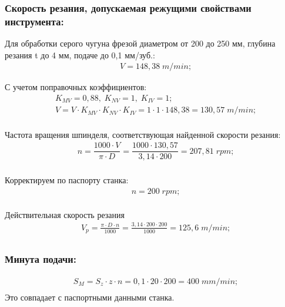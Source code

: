\subsubsection{Скорость резания, допускаемая режущими свойствами инструмента:}
Для обработки серого чугуна фрезой диаметром от 200 до 250 мм, глубина резания t до 4 мм, подаче до 0,1 мм/зуб.:
\begin{equation}
	\begin{split}
		&V=148,38\;m/min;
	\end{split}
\end{equation}

С учетом поправочных коэффициентов:
\begin{equation}
	\begin{split}
		&K_{MV}=0,88,\; K_{NV}=1,\; K_{IV}=1;\\
		&V=V\cdot K_{MV}\cdot K_{NV}\cdot K_{IV}=1\cdot 1\cdot 148,38 = 130,57\; m/min;\\
	\end{split}
\end{equation}

Частота вращения шпинделя, соответствующая найденной скорости резания:
\begin{equation}
	\begin{split}
		&n=\dfrac{1000\cdot V}{\pi \cdot D}=\dfrac{1000\cdot 130,57}{3,14\cdot 200}=207,81\; rpm;\\
	\end{split}
\end{equation}

Корректируем по паспорту станка:
\begin{equation}
	\begin{split}
		&n=200\; rpm;\\
	\end{split}
\end{equation}

Действительная скорость резания
\begin{equation}
	\begin{split}
		&V_p=\frac{\pi \cdot D\cdot n}{1000}=\frac{3,14 \cdot 200\cdot 200}{1000}=125,6\; m/min;\\
	\end{split}
\end{equation}

\subsubsection{Минута подачи:}
\begin{equation}
	\begin{split}
		&S_M=S_z\cdot z\cdot n =0,1\cdot 20\cdot 200 = 400\;mm/min;\\
	\end{split}
\end{equation}
Это совпадает с паспортными данными станка.

